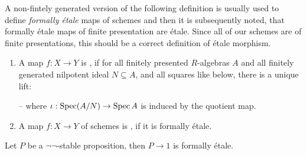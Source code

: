 
A non-fintely generated version of the following definition is usually used to define \emph{formally étale} maps of schemes and then it is subsequently noted,
that formally étale maps of finite presentation are étale.
Since all of our schemes are of finite presentations, this should be a correct definition of étale morphism.

\begin{definition}
  \begin{enumerate}
  \item   A map $f:X\to Y$ is ,
    if for all finitely presented $R$-algebras $A$ and all finitely generated nilpotent ideal $N\subseteq A$,
    and all squares like below, there is a unique lift:
    \begin{center}
    \end{center}
    -- where $\iota:\operatorname{Spec} (A/N)\to \operatorname{Spec} A$ is induced by the quotient map.
  \item A map $f:X\to Y$ of schemes is , if it is formally étale.
  \end{enumerate}
\end{definition}

\begin{proposition}%
  Let $P$ be a $\neg\neg$-stable proposition,
  then $P\to 1$ is formally étale.
\end{proposition}